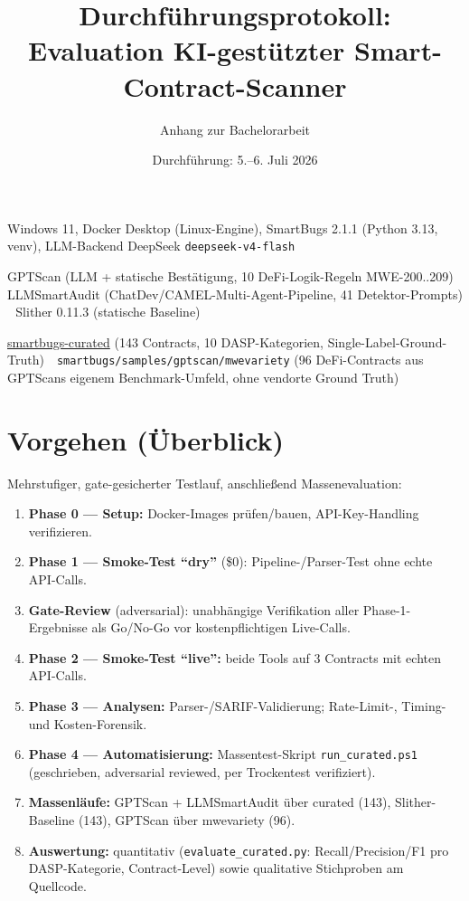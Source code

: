 \documentclass[11pt,a4paper]{scrartcl}
\title{Durchführungsprotokoll:\\Evaluation KI-gestützter Smart-Contract-Scanner}
\subtitle{Anhang zur Bachelorarbeit}
\date{Durchführung: 5.--6. Juli 2026}
\newcommand{\code}[1]{\texttt{#1}}
\begin{document}
\maketitle

\begin{description}[leftmargin=0pt, style=sameline]
  \item[Umgebung:] Windows 11, Docker Desktop (Linux-Engine), SmartBugs 2.1.1 (Python 3.13, venv), LLM-Backend DeepSeek \code{deepseek-v4-flash}
  \item[Evaluierte Tools:] GPTScan (LLM + statische Bestätigung, 10 DeFi-Logik-Regeln MWE-200..209) \,\textbullet\, LLMSmartAudit (ChatDev/CAMEL-Multi-Agent-Pipeline, 41 Detektor-Prompts) \,\textbullet\, Slither 0.11.3 (statische Baseline)
  \item[Datensätze:] \href{https://github.com/smartbugs/smartbugs-curated}{smartbugs-curated} (143 Contracts, 10 DASP-Kategorien, Single-Label-Ground-Truth) \,\textbullet\, \code{smartbugs/samples/gptscan/mwevariety} (96 DeFi-Contracts aus GPTScans eigenem Benchmark-Umfeld, ohne vendorte Ground Truth)
\end{description}

\section{Vorgehen (Überblick)}

Mehrstufiger, gate-gesicherter Testlauf, anschließend Massenevaluation:

\begin{enumerate}[nosep]
  \item \textbf{Phase 0 --- Setup:} Docker-Images prüfen/bauen, API-Key-Handling verifizieren.
  \item \textbf{Phase 1 --- Smoke-Test \enquote{dry}} (\$0): Pipeline-/Parser-Test ohne echte API-Calls.
  \item \textbf{Gate-Review} (adversarial): unabhängige Verifikation aller Phase-1-Ergebnisse als Go/No-Go vor kostenpflichtigen Live-Calls.
  \item \textbf{Phase 2 --- Smoke-Test \enquote{live}:} beide Tools auf 3 Contracts mit echten API-Calls.
  \item \textbf{Phase 3 --- Analysen:} Parser-/SARIF-Validierung; Rate-Limit-, Timing- und Kosten-Forensik.
  \item \textbf{Phase 4 --- Automatisierung:} Massentest-Skript \code{run\_curated.ps1} (geschrieben, adversarial reviewed, per Trockentest verifiziert).
  \item \textbf{Massenläufe:} GPTScan + LLMSmartAudit über curated (143), Slither-Baseline (143), GPTScan über mwevariety (96).
  \item \textbf{Auswertung:} quantitativ (\code{evaluate\_curated.py}: Recall/Precision/F1 pro DASP-Kategorie, Contract-Level) sowie qualitative Stichproben am Quellcode.
\end{enumerate}
\end{document}
